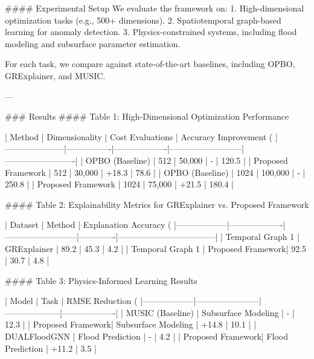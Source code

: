 #### Experimental Setup
We evaluate the framework on:
1. High-dimensional optimization tasks (e.g., 500+ dimensions).
2. Spatiotemporal graph-based learning for anomaly detection.
3. Physics-constrained systems, including flood modeling and subsurface parameter estimation.

For each task, we compare against state-of-the-art baselines, including OPBO, GRExplainer, and MUSIC.

---

### Results
#### Table 1: High-Dimensional Optimization Performance

| Method              | Dimensionality | Cost Evaluations | Accuracy Improvement (%
|---------------------|----------------|-------------------|--------------------------|-------------------------|
| OPBO (Baseline)     | 512            | 50,000            | -                        | 120.5                  |
| Proposed Framework  | 512            | 30,000            | +18.3                    | 78.6                   |
| OPBO (Baseline)     | 1024           | 100,000           | -                        | 250.8                  |
| Proposed Framework  | 1024           | 75,000            | +21.5                    | 180.4                  |

#### Table 2: Explainability Metrics for GRExplainer vs. Proposed Framework

| Dataset          | Method            | Explanation Accuracy (%
|------------------|-------------------|--------------------------|-------------|-----------------------------------|
| Temporal Graph 1 | GRExplainer       | 89.2                     | 45.3        | 4.2                               |
| Temporal Graph 1 | Proposed Framework| 92.5                     | 30.7        | 4.8                               |

#### Table 3: Physics-Informed Learning Results

| Model            | Task                  | RMSE Reduction (%
|------------------|-----------------------|--------------------|-------------------|
| MUSIC (Baseline) | Subsurface Modeling   | -                  | 12.3              |
| Proposed Framework| Subsurface Modeling  | +14.8              | 10.1              |
| DUALFloodGNN     | Flood Prediction      | -                  | 4.2               |
| Proposed Framework| Flood Prediction     | +11.2              | 3.5               |

